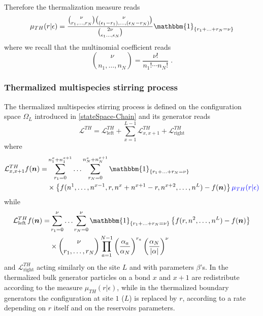 \documentclass[10pt]{article}
\numberwithin{equation}{section}
\numberwithin{equation}{subsection}
\newcommand{\dt}{\;.}
\newcommand{\fra}[1]{\textcolor[rgb]{0,0,1}{#1}}
\begin{document}
{\begin{equation}
\begin{split}
	\end{split}
\end{equation}
Therefore the thermalization measure reads
\begin{equation}
	\begin{split}
	\mu_{TH}(r|\epsilon)=\frac{\binom{\nu}{r_{1},\ldots,r_{N}}\binom{\nu}{(\epsilon_{1}-r_{1}),\ldots,(\epsilon_{N}-r_{N})}}{\binom{2\nu}{\epsilon_{1}\ldots,\epsilon_{N}}}\mathbbm{1}_{\{r_{1}+\ldots+r_{N}=\nu\}}
	\end{split}
\end{equation}
where we recall that the multinomial coefficient reads
\begin{equation}
	\binom{\nu}{n_{1},\ldots,n_{N}}=\frac{\nu!}{n_{1}!\cdots n_{N}!}\dt
\end{equation}

\subsubsection{Thermalized multispecies stirring process}
The thermalized multispecies stirring process is defined on the configuration space $\Omega_{L}$ introduced in \eqref{stateSpace-Chain} and its generator reads
\begin{equation}\label{thermalizedGenerator}
	\mathcal{L}^{TH}=\mathcal{L}_{\text{left}}^{TH}+\sum_{x=1}^{L-1}\mathcal{L}_{x,x+1}^{TH}+\mathcal{L}_{\text{right}}^{TH}
\end{equation}
where 
\begin{equation}\label{bulkThermalized}
	\begin{split}
	\mathcal{L}_{x,x+1}^{TH}f(\bm{n})=&\sum_{r_{1}=0}^{n_{1}^{x}+n_{1}^{x+1}}\ldots\sum_{r_{N}=0}^{n_{N}^{x}+n_{N}^{x+1}}\mathbbm{1}_{\{r_{1}+\ldots+r_{N}=\nu\}}
	\\&\times
	\left\{f(n^{1},\ldots,n^{x-1},r,n^{x}+n^{x+1}-r,n^{x+2},\ldots,n^{L})-f(\bm{n})\right\}\fra{\mu_{TH}({r}|{\epsilon})}
	\end{split}
\end{equation}
while
\begin{equation}\label{boundaryThermalized}
	\begin{split}
		\mathcal{L}_{\text{left}}^{TH}f(\bm{n})=&\sum_{r_{1}=0}^{\nu}\ldots\sum_{r_{N}=0}^{\nu}\mathbbm{1}_{\{r_{1}+\ldots+r_{N}=\nu\}}\left\{f(r,n^{2},\ldots,n^{L})-f(\bm{n})\right\}\\&\times
		\binom{\nu}{r_{1},\ldots, r_{N}}\prod_{a=1}^{N-1}\left(\frac{\alpha_{a}}{\alpha_{N}}\right)^{r_{a}}\left(\frac{\alpha_{N}}{|\alpha|}\right)^{\nu}
		\end{split}
	\end{equation} 
and $\mathcal{L}_{\text{right}}^{TH}$ acting similarly on the site $L$ and with parameters $\beta$'s. 
In the thermalized bulk generator particles on a bond $x$ and $x+1$ are redistribute according to the measure $\mu_{TH}(r|\epsilon)$, while in the thermalized boundary generators the configuration at site $1$ ($L$) is replaced by $r$, according to a rate depending on $r$ itself and on the reservoirs parameters. 
}
\end{document}
